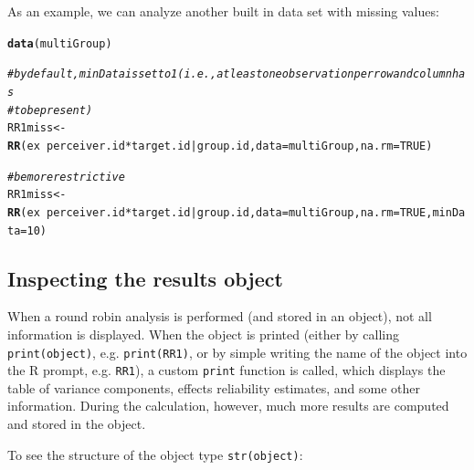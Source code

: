 \documentclass[a4paper]{article}\usepackage[]{graphicx}\usepackage[]{color}
\makeatletter
\newcommand{\hlnum}[1]{\textcolor[rgb]{0.686,0.059,0.569}{#1}}%
\newcommand{\hlcom}[1]{\textcolor[rgb]{0.678,0.584,0.686}{\textit{#1}}}%
\newcommand{\hlopt}[1]{\textcolor[rgb]{0,0,0}{#1}}%
\newcommand{\hlstd}[1]{\textcolor[rgb]{0.345,0.345,0.345}{#1}}%
\newcommand{\hlkwb}[1]{\textcolor[rgb]{0.69,0.353,0.396}{#1}}%
\newcommand{\hlkwc}[1]{\textcolor[rgb]{0.333,0.667,0.333}{#1}}%
\newcommand{\hlkwd}[1]{\textcolor[rgb]{0.737,0.353,0.396}{\textbf{#1}}}%
\newenvironment{kframe}{%
 \def\at@end@of@kframe{}%
 \ifinner\ifhmode%
  \def\at@end@of@kframe{\end{minipage}}%
  \begin{minipage}{\columnwidth}%
 \fi\fi%
 \def\FrameCommand##1{\hskip\@totalleftmargin \hskip-\fboxsep
 \colorbox{shadecolor}{##1}\hskip-\fboxsep
     \hskip-\linewidth \hskip-\@totalleftmargin \hskip\columnwidth}%
 \MakeFramed {\advance\hsize-\width
   \@totalleftmargin\z@ \linewidth\hsize
   \@setminipage}}%
 {\par\unskip\endMakeFramed%
 \at@end@of@kframe}
\newenvironment{knitrout}{}{} %
\makeatother
\begin{document}
As an example, we can analyze another built in data set with missing values:

\begin{knitrout}\small
{}\color{fgcolor}\begin{kframe}
\begin{alltt}
\hlkwd{data}\hlstd{(multiGroup)}

\hlcom{# by default, minData is set to 1 (i.e., at least one observation per row and column has}
\hlcom{# to be present)}
\hlstd{RR1miss} \hlkwb{<-} \hlkwd{RR}\hlstd{(ex} \hlopt{~} \hlstd{perceiver.id} \hlopt{*} \hlstd{target.id} \hlopt{|} \hlstd{group.id,} \hlkwc{data} \hlstd{= multiGroup,} \hlkwc{na.rm} \hlstd{=} \hlnum{TRUE}\hlstd{)}


\hlcom{# be more restrictive}
\hlstd{RR1miss} \hlkwb{<-} \hlkwd{RR}\hlstd{(ex} \hlopt{~} \hlstd{perceiver.id} \hlopt{*} \hlstd{target.id} \hlopt{|} \hlstd{group.id,} \hlkwc{data} \hlstd{= multiGroup,} \hlkwc{na.rm} \hlstd{=} \hlnum{TRUE}\hlstd{,} \hlkwc{minData} \hlstd{=} \hlnum{10}\hlstd{)}
\end{alltt}
\end{kframe}
\end{knitrout}






\subsection{Inspecting the results object} %
\label{sub:inspecting_the_results_object}
When a round robin analysis is performed (and stored in an object), not all information is displayed. When the object is printed (either by calling \texttt{print(object)}, e.g. \texttt{print(RR1)}, or by simple writing the name of the object into the R prompt, e.g. \texttt{RR1}), a custom \texttt{print} function is called, which displays the table of variance components, effects reliability estimates, and some other information. During the calculation, however, much more results are computed and stored in the object.

To see the structure of the object type \texttt{str(object)}:
\end{document}
